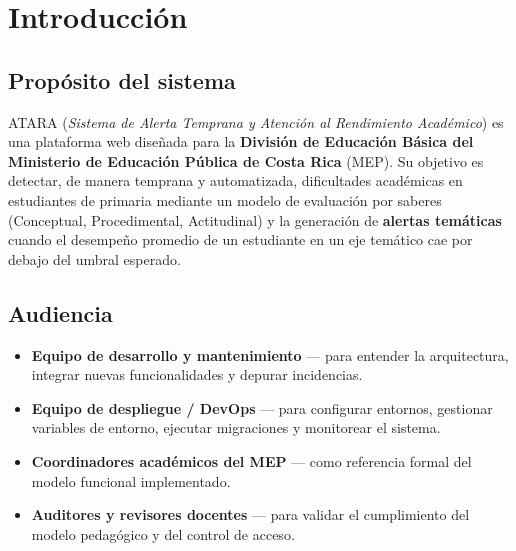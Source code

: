 \documentclass[11pt,a4paper,oneside]{article}
\begin{document}
\tableofcontents
\newpage


\section{Introducción}

\subsection{Propósito del sistema}

ATARA (\emph{Sistema de Alerta Temprana y Atención al Rendimiento Académico}) es una plataforma
web diseñada para la \textbf{División de Educación Básica del Ministerio de Educación Pública
de Costa Rica} (MEP). Su objetivo es detectar, de manera temprana y automatizada, dificultades
académicas en estudiantes de primaria mediante un modelo de evaluación por saberes
(Conceptual, Procedimental, Actitudinal) y la generación de \textbf{alertas temáticas} cuando
el desempeño promedio de un estudiante en un eje temático cae por debajo del umbral esperado.

\subsection{Audiencia}

\begin{itemize}[leftmargin=*]
  \item \textbf{Equipo de desarrollo y mantenimiento} — para entender la arquitectura,
        integrar nuevas funcionalidades y depurar incidencias.
  \item \textbf{Equipo de despliegue / DevOps} — para configurar entornos, gestionar
        variables de entorno, ejecutar migraciones y monitorear el sistema.
  \item \textbf{Coordinadores académicos del MEP} — como referencia formal del modelo
        funcional implementado.
  \item \textbf{Auditores y revisores docentes} — para validar el cumplimiento del modelo
        pedagógico y del control de acceso.
\end{itemize}
\end{document}
